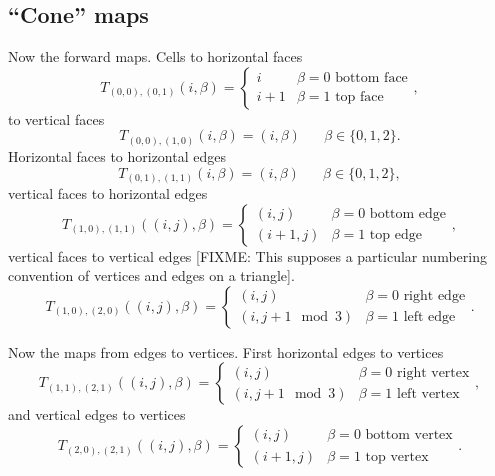 \documentclass[a4paper,11pt]{article}
\begin{document}
\subsection{``Cone'' maps}
\label{sec:cone-maps}

Now the forward maps.
Cells to horizontal faces
\begin{equation}
  \label{eq:1}
  T_{(0, 0), (0, 1)}(i, \beta) =
  \begin{cases}
    i & \beta = 0 \text{ bottom face}\\
    i+1 & \beta = 1 \text{ top face}
  \end{cases},
\end{equation}
to vertical faces
\begin{equation}
  \label{eq:2}
  T_{(0, 0), (1, 0)}(i, \beta) = (i, \beta) \quad \text{ $\beta \in \{0, 1, 2\}$}.
\end{equation}
Horizontal faces to horizontal edges
\begin{equation}
  \label{eq:12}
  T_{(0,1),(1,1)}(i,\beta) = (i, \beta) \quad \text{ $\beta \in \{0, 1, 2\}$},
\end{equation}
vertical faces to horizontal edges
\begin{equation}
  \label{eq:13}
  T_{(1,0),(1,1)}((i, j),\beta) =
  \begin{cases}
    (i, j) & \beta = 0 \text{ bottom edge}\\
    (i+1, j) & \beta = 1 \text{ top edge}
  \end{cases},
\end{equation}
vertical faces to vertical edges
[FIXME: This supposes a particular numbering convention of vertices and
edges on a triangle].
\begin{equation}
  \label{eq:14}
  T_{(1,0),(2,0)}((i, j),\beta) =
  \begin{cases}
    (i, j) & \beta = 0 \text{ right edge}\\
    (i, j + 1 \mod 3) & \beta = 1 \text{ left edge}
  \end{cases}.
\end{equation}

Now the maps from edges to vertices. First horizontal edges to
vertices
\begin{equation}
  \label{eq:15}
  T_{(1,1),(2,1)}((i,j), \beta) =
  \begin{cases}
    (i, j) & \beta = 0 \text{ right vertex}\\
    (i, j + 1 \mod 3) & \beta = 1 \text{ left vertex}
  \end{cases},
\end{equation}
and vertical edges to vertices
\begin{equation}
  \label{eq:16}
  T_{(2, 0),(2, 1)}((i, j), \beta) =
  \begin{cases}
    (i, j) & \beta = 0 \text{ bottom vertex}\\
    (i+1, j) & \beta = 1 \text{ top vertex}
  \end{cases}.
\end{equation}
\end{document}
